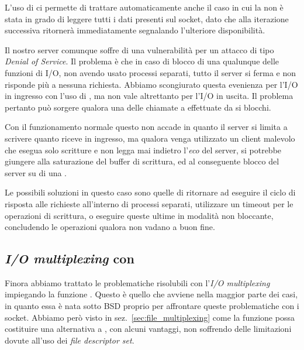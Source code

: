 L'uso di  ci permette di trattare automaticamente anche il caso
in cui la  non è stata in grado di leggere tutti i dati presenti
sul socket, dato che alla iterazione successiva  ritornerà
immediatamente segnalando l'ulteriore disponibilità.

Il nostro server comunque soffre di una vulnerabilità per un attacco di tipo
\textit{Denial of Service}. Il problema è che in caso di blocco di una
qualunque delle funzioni di I/O, non avendo usato processi separati, tutto il
server si ferma e non risponde più a nessuna richiesta. Abbiamo scongiurato
questa evenienza per l'I/O in ingresso con l'uso di , ma non vale
altrettanto per l'I/O in uscita. Il problema pertanto può sorgere qualora una
delle chiamate a  effettuate da  si blocchi. 

Con il funzionamento normale questo non accade in quanto il server si limita a
scrivere quanto riceve in ingresso, ma qualora venga utilizzato un client
malevolo che esegua solo scritture e non legga mai indietro l'\textsl{eco} del
server, si potrebbe giungere alla saturazione del buffer di scrittura, ed al
conseguente blocco del server su di una .

Le possibili soluzioni in questo caso sono quelle di ritornare ad eseguire il
ciclo di risposta alle richieste all'interno di processi separati, utilizzare
un timeout per le operazioni di scrittura, o eseguire queste ultime in
modalità non bloccante, concludendo le operazioni qualora non vadano a buon
fine.


\subsection{\textit{I/O multiplexing} con }
\label{sec:TCP_serv_poll}

Finora abbiamo trattato le problematiche risolubili con l'\textit{I/O
  multiplexing} impiegando la funzione . Questo è quello che
avviene nella maggior parte dei casi, in quanto essa è nata sotto BSD proprio
per affrontare queste problematiche con i socket.  Abbiamo però visto in
sez.~\ref{sec:file_multiplexing} come la funzione  possa costituire
una alternativa a , con alcuni vantaggi, non soffrendo delle
limitazioni dovute all'uso dei \textit{file descriptor set}.

